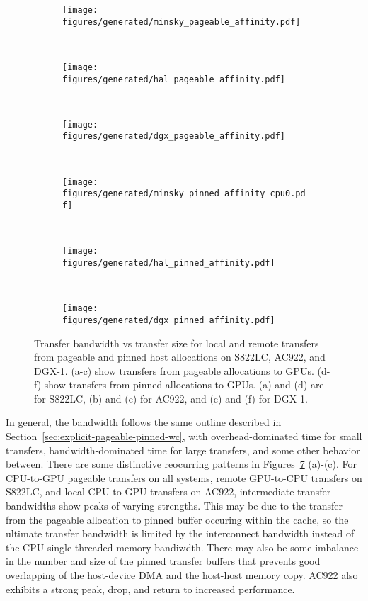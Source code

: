 \begin{figure}[ht]
	\centering
	\begin{subfigure}[b]{0.31\textwidth}
		\texttt{[image: figures/generated/minsky\_pageable\_affinity.pdf]}
		\caption{}
		\label{fig:minsky_pageable_affinity}
	\end{subfigure}
	~
	\begin{subfigure}[b]{0.31\textwidth}
		\texttt{[image: figures/generated/hal\_pageable\_affinity.pdf]}
		\caption{}
		\label{fig:hal_pageable_affinity}
	\end{subfigure}
	~
	\begin{subfigure}[b]{0.31\textwidth}
		\texttt{[image: figures/generated/dgx\_pageable\_affinity.pdf]}
		\caption{}
		\label{fig:dgx_pageable_affinity}
	\end{subfigure}
	\\
	\begin{subfigure}[b]{0.31\textwidth}
		\texttt{[image: figures/generated/minsky\_pinned\_affinity\_cpu0.pdf]}
		\caption{}
		\label{fig:minsky_pinned_affinity}
	\end{subfigure}
	~
	\begin{subfigure}[b]{0.31\textwidth}
		\texttt{[image: figures/generated/hal\_pinned\_affinity.pdf]}
		\caption{}
		\label{fig:hal_pinned_affinity}
	\end{subfigure}
	~
	\begin{subfigure}[b]{0.31\textwidth}
		\texttt{[image: figures/generated/dgx\_pinned\_affinity.pdf]}
		\caption{}
		\label{fig:dgx_pinned_affinity}
		
	\end{subfigure}
	\caption[CPU-GPU affinity and \texttt{cudaMemcpy} bandwidth]{
		Transfer bandwidth vs transfer size for local and remote transfers from pageable and pinned host allocations on S822LC, AC922, and DGX-1.
		(a-c) show transfers from pageable allocations to GPUs.
		(d-f) show transfers from pinned allocations to GPUs.
		(a) and (d) are for S822LC, (b) and (e) for AC922, and (c) and (f) for DGX-1.
	}
	\label{fig:cpu-gpu-affinity-direction}
\end{figure}

In general, the bandwidth follows the same outline described in Section~\ref{sec:explicit-pageable-pinned-wc}, with overhead-dominated time for small transfers, bandwidth-dominated time for large transfers, and some other behavior between.
There are some distinctive reocurring patterns in Figures~\ref{fig:cpu-gpu-affinity-direction} (a)-(c).
For CPU-to-GPU pageable transfers on all systems, remote GPU-to-CPU transfers on S822LC, and local CPU-to-GPU transfers on AC922, intermediate transfer bandwidths show peaks of varying strengths.
This may be due to the transfer from the pageable allocation to pinned buffer occuring within the cache, so the ultimate transfer bandwidth is limited by the interconnect bandwidth instead of the CPU single-threaded memory bandiwdth.
There may also be some imbalance in the number and size of the pinned transfer buffers that prevents good overlapping of the host-device DMA and the host-host memory copy.
AC922 also exhibits a strong peak, drop, and return to increased performance.

